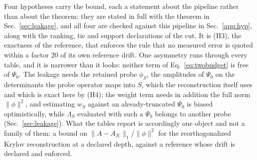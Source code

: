 Four hypotheses carry the bound, each a statement about the pipeline rather than about the theorem;
they are stated in full with the theorem in Sec.~\ref{sec:leakage}, and all four are checked against
this pipeline in Sec.~\ref{app:hyp}, along with the ranking, tie and support declarations of the cut.
It is (H3), the exactness of the reference, that enforces the rule that no measured error is quoted
within a factor $20$ of its own reference drift.
One asymmetry runs through every table, and it is narrower than it looks: neither term of
Eq.~\eqref{eq:twobudget} is free of $\Psi_0$. The leakage needs the retained probe $\phi_S$, the
amplitudes of $\Psi_0$ on the determinants the probe operator maps into $S$, which the reconstruction
itself uses and which is exact here by (H4); the weight term needs in addition the full norm
$\lVert\phi\rVert^{2}$, and estimating $w_S$ against an already-truncated $\Psi_0$ is biased
optimistically, while $\Lambda_S$ evaluated with such a $\Psi_0$ belongs to another probe
(Sec.~\ref{sec:leakage}). What the tables report is
accordingly one object and not a family of them: a bound on
$\lVert A-A_{\mathcal K}\rVert_1/\lVert\phi\rVert^{2}$ for the reorthogonalized Krylov reconstruction
at a declared depth, against a reference whose drift is declared and enforced.

